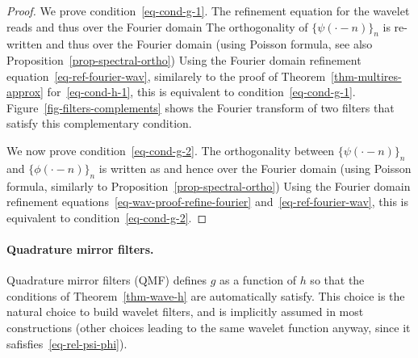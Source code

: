 \begin{proof}
We prove condition~\eqref{eq-cond-g-1}.
%
The refinement equation for the wavelet reads
and thus over the Fourier domain
The orthogonality of $\{ \psi(\cdot-n) \}_n$ is re-written
and thus over the Fourier domain (using Poisson formula, see also Proposition~\ref{prop-spectral-ortho})
Using the Fourier domain refinement equation~\eqref{eq-ref-fourier-wav}, similarely to the proof of Theorem~\ref{thm-multires-approx} for~\eqref{eq-cond-h-1}, this is equivalent to condition~\eqref{eq-cond-g-1}.
%
Figure~\ref{fig-filters-complements} shows the Fourier transform of two filters that satisfy this complementary condition.


We now prove condition~\eqref{eq-cond-g-2}.
%
The orthogonality between $\{ \psi(\cdot-n) \}_n$ and $\{ \phi(\cdot-n) \}_n$ is written as
and hence over the Fourier domain (using Poisson formula, similarly to Proposition~\ref{prop-spectral-ortho})
Using the Fourier domain refinement equations~\eqref{eq-wav-proof-refine-fourier} and~\eqref{eq-ref-fourier-wav}, this is equivalent to condition~\eqref{eq-cond-g-2}.
\end{proof}





\paragraph{Quadrature mirror filters.}

Quadrature mirror filters (QMF) defines $g$ as a function of $h$ so that the conditions of Theorem~\ref{thm-wave-h} are automatically satisfy. This choice is the natural choice to build wavelet filters, and is implicitly assumed in most constructions (other choices leading to the same wavelet function anyway, since it safisfies~\eqref{eq-rel-psi-phi}).

